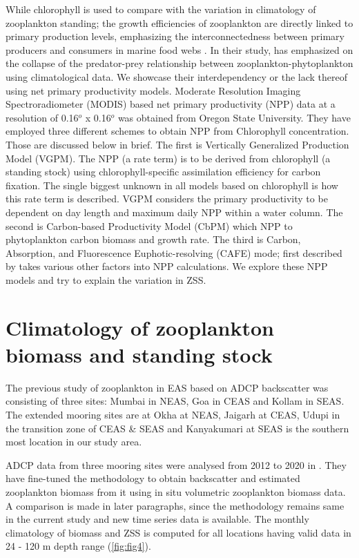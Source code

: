 \documentclass{article}
\begin{document}
	While chlorophyll is used to compare with the variation in climatology of zooplankton standing; the growth efficiencies of zooplankton are directly linked to primary production levels, emphasizing the interconnectedness between primary producers and consumers in marine food webs \citep{Friedland.2012}. In their study, \citep{aparna2022seasonal} has emphasized on the collapse of the predator-prey relationship between zooplankton-phytoplankton using climatological data. We showcase their interdependency or the lack thereof using net primary productivity models.
	Moderate Resolution Imaging Spectroradiometer (MODIS) based net primary productivity (NPP) data at a resolution of 0.16$^o$ x 0.16$^o$ was obtained from Oregon State University. They have employed three different schemes to obtain NPP from Chlorophyll concentration. Those are discussed below in brief. The first is Vertically Generalized Production Model (VGPM). The NPP (a rate term) is to be derived from chlorophyll (a standing stock) using chlorophyll-specific assimilation efficiency for carbon fixation. The single biggest unknown in all models based on chlorophyll is how this rate term is described. VGPM considers the primary productivity to be dependent on day length and maximum daily NPP within a water column. The second is Carbon-based Productivity Model (CbPM) which NPP to phytoplankton carbon biomass and growth rate. The third is Carbon, Absorption, and Fluorescence Euphotic-resolving (CAFE) mode; first described by \citep{silsbe2016cafe} takes various other factors into NPP calculations. We explore these NPP models and try to explain the variation in ZSS.
	 
	\section{Climatology of zooplankton biomass and standing stock}
	The previous study of zooplankton in EAS based on ADCP backscatter was consisting of three sites: Mumbai in NEAS, Goa in CEAS and Kollam in SEAS. The extended mooring sites are at Okha at NEAS, Jaigarh at CEAS, Udupi in the transition zone of CEAS \& SEAS and Kanyakumari at SEAS is the southern most location in our study area. 

	ADCP data from three mooring sites were analysed from 2012 to 2020 in \citep{aparna2022seasonal}. They have fine-tuned the methodology to obtain backscatter and estimated zooplankton biomass from it using in situ volumetric zooplankton biomass data. A comparison is made in later paragraphs, since the methodology remains same in the current study and new time series data is available. The monthly climatology of biomass and ZSS is computed for all locations having valid data in 24 - 120 m depth range (\cref{fig:fig4}).
	 
\end{document}
